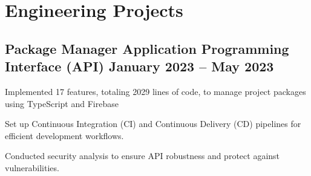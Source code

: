 \section{Engineering Projects}
\subsection{{Package Manager Application Programming Interface (API) \hfill January 2023 – May 2023}}
\begin{zitemize}
\item Implemented 17 features, totaling 2029 lines of code, to manage project packages using TypeScript and Firebase
\item Set up Continuous Integration (CI) and Continuous Delivery (CD) pipelines for efficient development workflows.
\item Conducted security analysis to ensure API robustness and protect against vulnerabilities.

\end{zitemize}